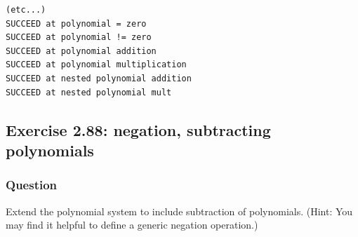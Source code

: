 \documentclass[final,fleqn,titlepage,twoside]{article}
\begin{document}
\begin{verbatim}
(etc...)
SUCCEED at polynomial = zero
SUCCEED at polynomial != zero
SUCCEED at polynomial addition
SUCCEED at polynomial multiplication
SUCCEED at nested polynomial addition
SUCCEED at nested polynomial mult
\end{verbatim}

\subsection{Exercise 2.88: negation, subtracting polynomials}
\label{sec:org0ce33ff}
\subsubsection{Question}
\label{sec:orgff0b681}
Extend the polynomial system to include subtraction of polynomials. (Hint: You
may find it helpful to define a generic negation operation.)
\end{document}
